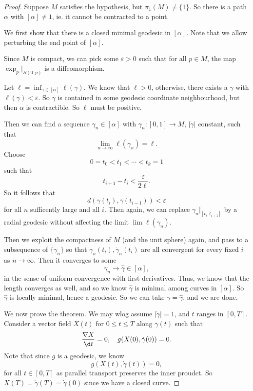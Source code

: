 \documentclass[a4paper]{article}
\begin{document}
\begin{proof}
  Suppose $M$ satisfies the hypothesis, but $\pi_1(M) \not= \{1\}$. So there is a path $\alpha$ with $[\alpha] \not= 1$, ie. it cannot be contracted to a point.

  We first show that there is a closed minimal geodesic in $[\alpha]$. Note that we allow perturbing the end point of $[\alpha]$.

  Since $M$ is compact, we can pick some $\varepsilon > 0$ such that for all $p \in M$, the map $\exp_p |_{B(0, p)}$ is a diffeomorphism.

  Let $\ell = \inf_{\gamma \in [\alpha]} \ell(\gamma)$. We know that $\ell > 0$, otherwise, there exists a $\gamma$ with $\ell(\gamma) < \varepsilon$. So $\gamma$ is contained in some geodesic coordinate neighbourhood, but then $\alpha$ is contractible. So $\ell$ must be positive.

  Then we can find a sequence $\gamma_n \in [\alpha]$ with $\gamma_n: [0, 1] \to M$, $|\dot{\gamma}|$ constant, such that
  \[
    \lim_{n \to \infty} \ell(\gamma_n) = \ell.
  \]
  Choose
  \[
    0 = t_0 < t_1 < \cdots < t_k = 1
  \]
  such that
  \[
    t_{i + 1} - t_i < \frac{\varepsilon}{2 \ell}.
  \]
  So it follows that
  \[
    d(\gamma(t_i), \gamma(t_{i - 1})) < \varepsilon
  \]
  for all $n$ sufficently large and all $i$. Then again, we can replace $\gamma_n|_{[t_i, t_{i + 1}]}$ by a radial geodesic without affecting the limit $\lim \ell(\gamma_n)$.

  Then we exploit the compactness of $M$ (and the unit sphere) again, and pass to a subsequence of $\{\gamma_n\}$ so that $\gamma_n(t_i), \dot{\gamma}_n (t_i)$ are all convergent for every fixed $i$ as $n \to \infty$. Then it converges to some
  \[
    \gamma_n \to \hat{\gamma} \in [\alpha],
  \]
  in the sense of uniform convergence with first derivatives. Thus, we know that the length converges as well, and so we know $\hat{\gamma}$ is minimal among curves in $[\alpha]$. So $\hat{\gamma}$ is locally minimal, hence a geodesic. So we can take $\gamma = \hat{\gamma}$, and we are done.

  We now prove the theorem. We may wlog assume $|\dot{\gamma}| = 1$, and $t$ ranges in $[0, T]$. Consider a vector field $X(t)$ for $0 \leq t \leq T$ along $\gamma(t)$ such that
  \[
    \frac{\nabla X}{\d t} = 0,\quad g(X(0), \dot{\gamma}(0)) = 0.
  \]
  Note that since $g$ is a geodesic, we know
  \[
    g(X(t), \dot{\gamma}(t)) = 0,
  \]
  for all $t \in [0, T]$ as parallel transport preserves the inner proudct. So $X(T) \perp \dot{\gamma}(T) = \dot{\gamma}(0)$ since we have a closed curve.


\end{proof}
\end{document}

